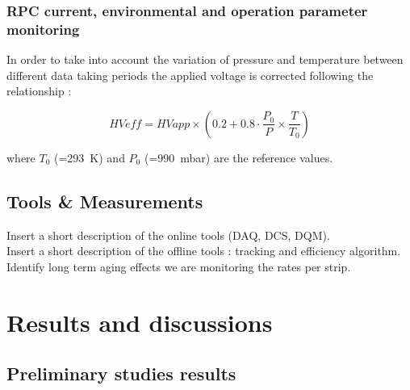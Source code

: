 			\subsubsection{\acs{RPC} current, environmental and operation parameter monitoring}
            
			In order to take into account the variation of pressure and temperature between different data taking periods the applied voltage is corrected following the relationship :

\begin{equation}
	HVeff = HVapp\times\left(0.2 + 0.8\cdot\frac{P_0}{P}\times\frac{T}{T_0}\right)
\end{equation}

where $T_0$ (=\SI{293}{K}) and $P_0$ (=\SI{990}{mbar}) are the reference values.

	\subsection{Tools \& Measurements}

	Insert a short description of the online tools (DAQ, DCS, DQM).\\
	Insert a short description of the offline tools : tracking and efficiency algorithm.\\
	Identify long term aging effects we are monitoring the rates per strip.

\section{Results and discussions}
\label{sec:results6}

	\subsection{Preliminary studies results}
	\label{ssec:GIFResults}
	
